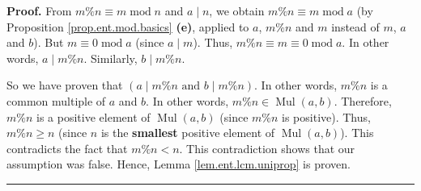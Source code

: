 \documentclass[numbers=enddot,12pt,final,onecolumn,notitlepage]{scrartcl}%
\numberwithin{exer}{subsection}
\theoremstyle{definition}
\newenvironment{proof}[1][Proof]{\noindent\textbf{#1.} }{\ \rule{0.5em}{0.5em}}
\begin{document}
\begin{proof}
From $m\%n\equiv m\operatorname{mod}n$ and $a\mid n$, we obtain $m\%n\equiv
m\operatorname{mod}a$ (by Proposition \ref{prop.ent.mod.basics} \textbf{(e)},
applied to $a$, $m\%n$ and $m$ instead of $m$, $a$ and $b$). But
$m\equiv0\operatorname{mod}a$ (since $a\mid m$). Thus, $m\%n\equiv
m\equiv0\operatorname{mod}a$. In other words, $a\mid m\%n$. Similarly, $b\mid
m\%n$.

So we have proven that $\left(  a\mid m\%n\text{ and }b\mid m\%n\right)  $. In
other words, $m\%n$ is a common multiple of $a$ and $b$. In other words,
$m\%n\in\operatorname*{Mul}\left(  a,b\right)  $. Therefore, $m\%n$ is a
positive element of $\operatorname*{Mul}\left(  a,b\right)  $ (since $m\%n$ is
positive). Thus, $m\%n\geq n$ (since $n$ is the \textbf{smallest} positive
element of $\operatorname*{Mul}\left(  a,b\right)  $). This contradicts the
fact that $m\%n<n$. This contradiction shows that our assumption was false.
Hence, Lemma \ref{lem.ent.lcm.uniprop} is proven.
\end{proof}
\end{document}
